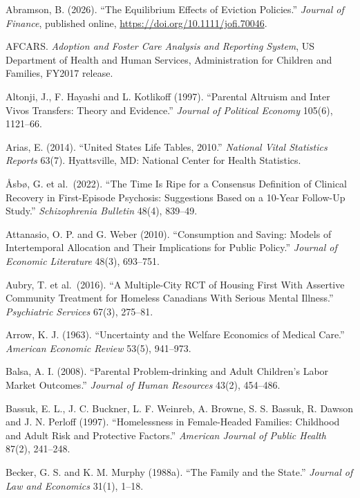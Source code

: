 \documentclass[10pt]{article}
\begin{document}
{\normalsize
\setlength{\parindent}{0em}
\begin{list}{}{\setlength{\leftmargin}{1.5em}\setlength{\itemindent}{-1.5em}\setlength{\itemsep}{0.35em}\setlength{\parsep}{0em}}
\item Abramson, B. (2026). ``The Equilibrium Effects of Eviction Policies.'' \emph{Journal of Finance}, published online, \url{https://doi.org/10.1111/jofi.70046}.
\item AFCARS. \emph{Adoption and Foster Care Analysis and Reporting System}, US Department of Health and Human Services, Administration for Children and Families, FY2017 release.
\item Altonji, J., F. Hayashi and L. Kotlikoff (1997). ``Parental Altruism and Inter Vivos Transfers: Theory and Evidence.'' \emph{Journal of Political Economy} 105(6), 1121--66.
\item Arias, E. (2014). ``United States Life Tables, 2010.'' \emph{National Vital Statistics Reports} 63(7). Hyattsville, MD: National Center for Health Statistics.
\item {\AA}sb{\o}, G. et al.\ (2022). ``The Time Is Ripe for a Consensus Definition of Clinical Recovery in First-Episode Psychosis: Suggestions Based on a 10-Year Follow-Up Study.'' \emph{Schizophrenia Bulletin} 48(4), 839--49.
\item Attanasio, O. P. and G. Weber (2010). ``Consumption and Saving: Models of Intertemporal Allocation and Their Implications for Public Policy.'' \emph{Journal of Economic Literature} 48(3), 693--751.
\item Aubry, T. et al.\ (2016). ``A Multiple-City RCT of Housing First With Assertive Community Treatment for Homeless Canadians With Serious Mental Illness.'' \emph{Psychiatric Services} 67(3), 275--81.
\item Arrow, K. J. (1963). ``Uncertainty and the Welfare Economics of Medical Care.'' \emph{American Economic Review} 53(5), 941--973.
\item Balsa, A. I. (2008). ``Parental Problem-drinking and Adult Children's Labor Market Outcomes.'' \emph{Journal of Human Resources} 43(2), 454--486.
\item Bassuk, E. L., J. C. Buckner, L. F. Weinreb, A. Browne, S. S. Bassuk, R. Dawson and J. N. Perloff (1997). ``Homelessness in Female-Headed Families: Childhood and Adult Risk and Protective Factors.'' \emph{American Journal of Public Health} 87(2), 241--248.
\item Becker, G. S. and K. M. Murphy (1988a). ``The Family and the State.'' \emph{Journal of Law and Economics} 31(1), 1--18.

\end{list}}
\end{document}
